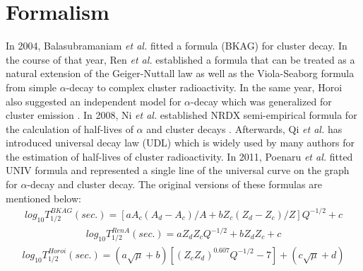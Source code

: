 \documentclass[preprint,10pt]{elsarticle}
\begin{document}
\section{Formalism}
In 2004, Balasubramaniam \textit{et al.} fitted a formula (BKAG) \cite{balasubramaniam2004} for cluster decay. In the course of that year, Ren \textit{et al.} established a formula \cite{rena2004} that can be treated as a natural extension of the Geiger-Nuttall law \cite{geigernuttall1991} as well as the Viola-Seaborg formula \cite{viola1966} from simple $\alpha$-decay to complex cluster radioactivity. In the same year, Horoi also suggested an independent model for $\alpha$-decay which was generalized for cluster emission \cite{horoi2004}. In 2008, Ni \textit{et al.} established NRDX semi-empirical formula for the calculation of half-lives of $\alpha$ and cluster decays \cite{nrdx2008}. Afterwards, Qi \textit{et al.} has introduced universal decay law (UDL) \cite{udl2009} which is widely used by many authors for the estimation of half-lives of cluster radioactivity. In 2011, Poenaru \textit{et al.} fitted UNIV formula \cite{univ2011} and represented a single line of the universal curve on the graph for $\alpha$-decay and cluster decay. The original versions of these formulas are mentioned below:
\begin{eqnarray}
 log_{10}T_{1/2}^{BKAG}(sec.) = [aA_{c}(A_{d}-A_{c})/A + bZ_{c}(Z_{d}-Z_{c})/Z]Q^{-1/2} + c
 \label{eqbkag}
 \end{eqnarray}
 \begin{eqnarray}
 log_{10}T_{1/2}^{RenA}(sec.) = aZ_{d}Z_{c}Q^{-1/2} + bZ_{d}Z_{c} + c \label{eqrena}
 \end{eqnarray}
\begin{eqnarray}
log_{10}T_{1/2}^{Horoi}(sec.) = (a\sqrt{\mu} + b)[(Z_{c}Z_{d})^{0.607}Q^{-1/2} - 7] + (c\sqrt{\mu} + d)
\label{eqhoroi}
\end{eqnarray}
\end{document}
